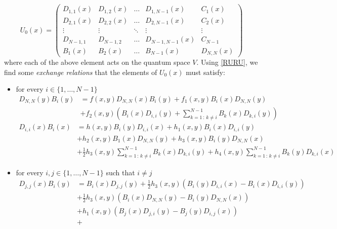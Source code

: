 \documentclass[10pt]{article}
\numberwithin{equation}{section}
\numberwithin{equation}{subsection}
\begin{document}
\begin{equation}\label{matrixForm-U}
	U_{0}(x)=\begin{pmatrix}
		D_{1,1}(x)&D_{1,2}(x)&\ldots&D_{1,N-1}(x)&C_{1}(x)\\
		D_{2,1}(x)&D_{2,2}(x)&\ldots&D_{2,N-1}(x)&C_{2}(x)\\
		\vdots&\vdots&\ddots&\vdots&\vdots\\
		D_{N-1,1}&D_{N-1,2}&\ldots&D_{N-1,N-1}(x)&C_{N-1}\\
		B_{1}(x)&B_{2}(x)&\ldots&B_{N-1}(x)&D_{N,N}(x)
	\end{pmatrix}
\end{equation}
where each of the above element acts on the quantum space $V$. Using \eqref{RURU}, we find some \textit{exchange relations} that the elements of $U_{0}(x)$ must satisfy: 
\begin{itemize}
	\item for every $i\in\{1,\ldots,N-1\}$
	\begin{equation}\label{EX1}
		\begin{split}
			D_{N,N}(y)B_{i}(y)&=f(x,y)D_{N,N}(x)B_{i}(y)+f_{1}(x,y)B_{i}(x)D_{N,N}(y)\\&+f_{2}(x,y)\left(B_{i}(x)D_{i,i}(y)+\sum_{k=1\,:\,k\neq i}^{N-1}B_{k}(x)D_{k,i}(y)\right)
		\end{split}	
	\end{equation}
	\begin{equation}\label{EX2}
		\begin{split}
			D_{i,i}(x)B_{i}(x)&=h(x,y)B_{i}(y)D_{i,i}(x)+h_{1}(x,y)B_{i}(x)D_{i,i}(y)\\&+h_{2}(x,y)B_{1}(x)D_{N,N}(y)+h_{3}(x,y)B_{i}(y)D_{N,N}(x)\\&+\frac{1}{2}h_{3}(x,y)\sum_{k=1\,:\, k\neq i}^{N-1}B_{k}(x)D_{k,i}(y)+h_{4}(x,y)\sum_{k=1\,:\, k\neq i}^{N-1}B_{k}(y)D_{k,i}(x)
		\end{split}
	\end{equation}
	\item  for every $i,j\in \{1,\ldots,N-1\}$ such that $i\neq j$
	\begin{equation}\label{EX3}
		\begin{split}
			D_{j,j}(x)B_{i}(y)&=B_{i}(x)D_{j,j}(y)+\frac{1}{2}h_{3}(x,y)\left(B_{i}(y)D_{i,i}(x)-B_{i}(x)D_{i,i}(y)\right)
			\\&+
			\frac{1}{2}h_{3}(x,y)\left(B_{i}(x)D_{N,N}(y)-B_{i}(y)D_{N,N}(x)\right)
			\\&+
			h_{1}(x,y)\left(B_{j}(x)D_{j,i}(y)-B_{j}(y)D_{i,j}(x)\right)
			\\&+

\end{split}
\end{equation}
\end{itemize}
\end{document}
